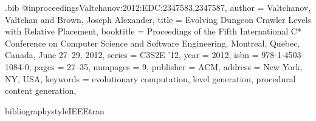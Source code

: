 \begin{filecontents*}{\ourreferences.bib}
	@inproceedings{Valtchanov:2012:EDC:2347583.2347587,
		author = {Valtchanov, Valtchan and Brown, Joseph Alexander},
		title = {Evolving Dungeon Crawler Levels with Relative Placement},
		booktitle = {Proceedings of the Fifth International C* Conference on Computer Science 
			and Software Engineering, Montreal, Quebec, Canada, June 27--29, 2012},
		series = {C3S2E '12},
		year = {2012},
		isbn = {978-1-4503-1084-0},
		pages = {27--35},
		numpages = {9},
		publisher = {ACM},
		address = {New York, NY, USA},
		keywords = {evolutionary computation, level generation, procedural content generation},
	} 
\end{filecontents*}
bibliographystyle{IEEEtran}